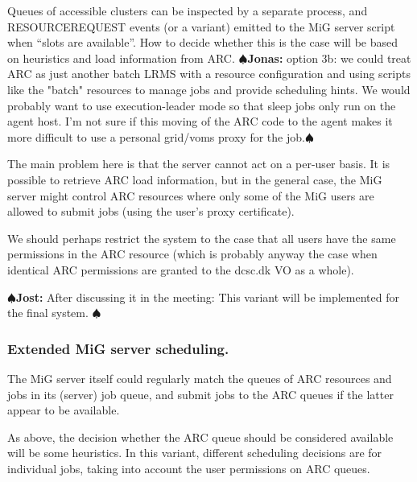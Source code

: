 \documentclass[11pt]{article}
\newcommand{\comm}[2]{{\scriptsize
    \(\spadesuit\){\bf #1: }{\rm \sf #2}\(\spadesuit\)}}
\newcommand{\jonas}[1]{\comm{Jonas}{#1}}
\newcommand{\jost}[1]{\comm{Jost}{#1}}
\begin{document}
    Queues of accessible clusters can be inspected by a separate
    process, and RESOURCEREQUEST events (or a variant) emitted to the
    MiG server script when ``slots are available''. How to decide
    whether this is the case will be based on heuristics and load
    information from ARC.  
\jonas{option 3b: we could treat ARC as just another batch LRMS with a
  resource configuration and using scripts like the "batch" resources
  to manage jobs and provide scheduling hints. We would probably want
  to use execution-leader mode so that sleep jobs only run on the
  agent host. I'm not sure if this moving of the ARC code to the agent
  makes it more difficult to use a personal grid/voms proxy for the
  job.}

    The main problem here is that the server cannot act on a per-user
    basis. It is possible to retrieve ARC load information, but in the
    general case, the MiG server might control ARC resources where
    only some of the MiG users are allowed to submit jobs (using the
    user's proxy certificate).

    We should perhaps restrict the system to the case that all users
    have the same permissions in the ARC resource (which is probably
    anyway the case when identical ARC permissions are granted to the
    dcsc.dk VO as a whole).

\jost{After discussing it in the meeting: This variant will be
  implemented for the final system. }



\subsubsection{Extended MiG server scheduling.} 
    The MiG server itself could regularly match the queues of
    ARC resources and jobs in its (server) job queue, and submit
    jobs to the ARC queues if the latter appear to be available.

    As above, the decision whether the ARC queue should be considered
    available will be some heuristics. In this variant, different
    scheduling decisions are for individual jobs, taking into account
    the user permissions on ARC queues.
\end{document}
